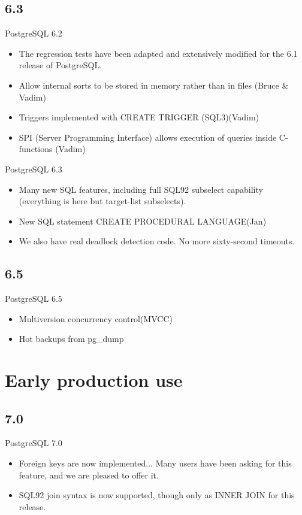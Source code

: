 \documentclass[t,10pt]{beamer}
\begin{document}
\subsection{6.3}
\begin{frame}{PostgreSQL 6.2}
  \begin{itemize}%
  \item The regression tests have been adapted and extensively modified for the 6.1 release of PostgreSQL.
  \item Allow internal sorts to be stored in memory rather than in files (Bruce \& Vadim)
  \item Triggers implemented with CREATE TRIGGER (SQL3)(Vadim)
  \item SPI (Server Programming Interface) allows execution of queries inside C-functions (Vadim)
  \end{itemize}
\end{frame}
\begin{frame}{PostgreSQL 6.3}
  \begin{itemize}%
  \item Many new SQL features, including full SQL92 subselect capability (everything is here but target-list subselects).
  \item New SQL statement CREATE PROCEDURAL LANGUAGE(Jan)
  \item We also have real deadlock detection code. No more sixty-second timeouts.
  \end{itemize}
\end{frame}
\subsection{6.5}
\begin{frame}{PostgreSQL 6.5}
  \begin{itemize}%
  \item Multiversion concurrency control(MVCC)
  \item Hot backups from pg\_dump
  \end{itemize}
\end{frame}


\section{Early production use}
\subsection{7.0}
\begin{frame}{PostgreSQL 7.0}
  \begin{itemize}%
  \item Foreign keys are now implemented... Many users have been asking for this feature, and we are pleased to offer it.
  \item SQL92 join syntax is now supported, though only as INNER JOIN for this release. 
  \end{itemize}
\end{frame}
\end{document}
